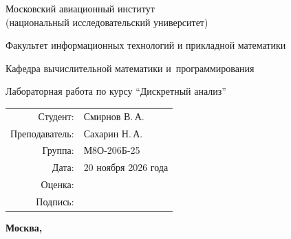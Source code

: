 \documentclass[12pt,a4paper,oneside,fleqn]{article}
\begin{document}
\hypersetup{pageanchor=false}
\begin{titlepage}
\begin{center}
\bfseries

{\Large Московский авиационный институт\\ (национальный исследовательский университет)

}

\vspace{48pt}

{\large Факультет информационных технологий и прикладной математики
}

\vspace{36pt}

{\large Кафедра вычислительной математики и~программирования

}


\vspace{48pt}

Лабораторная работа  по курсу \enquote{Дискретный анализ}

\end{center}

\vspace{72pt}

\begin{flushright}
\begin{tabular}{rl}
Студент: & Смирнов В.\,А. \\
Преподаватель: & Сахарин Н.\,А. \\
Группа: & М8О-206Б-25 \\
Дата: & 20 ноября 2026 года \\
Оценка: & \\
Подпись: & \\
\end{tabular}
\end{flushright}

\vfill

\begin{center}
\bfseries
Москва, \the\year
\end{center}
\end{titlepage}
\hypersetup{pageanchor=true}

\renewcommand{\thesubsection}{\thesection.\arabic{subsection}}




\clearpage


\end{document}
